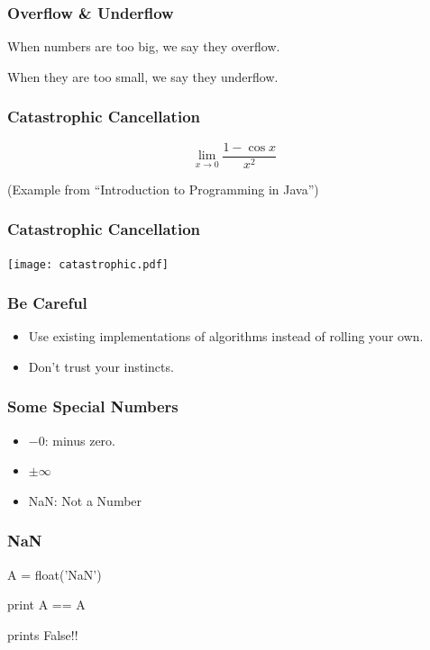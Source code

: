 \begin{frame}[fragile]
\frametitle{Overflow \& Underflow}

When numbers are too big, we say they \alert{overflow}.

When they are too small, we say they \alert{underflow}.
\end{frame}


\begin{frame}[fragile]
\frametitle{Catastrophic Cancellation}

\[
\lim_{x \to 0} \frac{1-\cos x}{x^2}
\]

%
\begin{flushright}
(Example from ``Introduction to Programming in Java'')
\end{flushright}
\end{frame}
\begin{frame}[fragile]
\frametitle{Catastrophic Cancellation}

\centering
\texttt{[image: catastrophic.pdf]}

\end{frame}

\begin{frame}[fragile]
\frametitle{Be Careful}

\begin{itemize}
\item Use existing implementations of algorithms instead of rolling your own.
\item Don't trust your instincts.
\end{itemize}
\end{frame}

\begin{frame}[fragile]
\frametitle{Some Special Numbers}

\begin{itemize}
\item $-0$: minus zero.
\item $\pm \infty$
\item NaN: Not a Number
\end{itemize}
\end{frame}

\begin{frame}[fragile]
\frametitle{NaN}
\begin{python}
A = float('NaN')

print A == A
\end{python}
prints \alert{False}!!

\end{frame}


